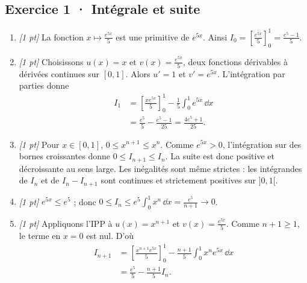 \subsection*{Exercice 1 · Intégrale et suite}\begin{enumerate}

\item \textit{[1 pt]} La fonction $x\mapsto \frac{e^{5x}}{5}$ est une primitive de $e^{5x}$. Ainsi $I_0=[\frac{e^{5x}}{5}]_0^1=\frac{e^{5}-1}{5}$.

\item \textit{[1 pt]} Choisissons $u(x)=x$ et $v(x)=\frac{e^{5x}}{5}$, deux fonctions dérivables à dérivées continues sur $[0,1]$. Alors $u'=1$ et $v'=e^{5x}$. L'intégration par parties donne
\[\begin{aligned}I_1&=\left[\frac{xe^{5x}}{5}\right]_0^1-\frac{1}{5}\int_0^1e^{5x}\,\dd x\\&=\frac{e^{5}}{5}-\frac{e^{5}-1}{25}=\frac{4e^{5}+1}{25}.\end{aligned}\]

\item \textit{[1 pt]} Pour $x\in[0,1]$, $0\le x^{n+1}\le x^n$. Comme $e^{5x}>0$, l'intégration sur des bornes croissantes donne $0\le I_{n+1}\le I_n$. La suite est donc positive et décroissante au sens large. Les inégalités sont même strictes : les intégrandes de $I_n$ et de $I_n-I_{n+1}$ sont continues et strictement positives sur $]0,1[$.

\item \textit{[1 pt]} $e^{5x}\le e^{5}$ ; donc $0\le I_n\le e^{5}\int_0^1x^n\,\dd x=\frac{e^{5}}{n+1}\to0$.

\item \textit{[1 pt]} Appliquons l'IPP à $u(x)=x^{n+1}$ et $v(x)=\frac{e^{5x}}{5}$. Comme $n+1\ge1$, le terme en $x=0$ est nul. D'où
\[\begin{aligned}I_{n+1}&=\left[\frac{x^{n+1}e^{5x}}{5}\right]_0^1-\frac{n+1}{5}\int_0^1x^ne^{5x}\,\dd x\\&=\frac{e^{5}}{5}-\frac{n+1}{5}I_n.\end{aligned}\]

\end{enumerate}

